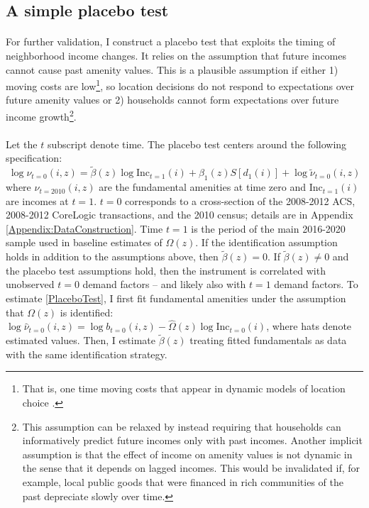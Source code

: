 \documentclass[12pt]{article}
\begin{document}
\subsection{A simple placebo test} 
\paragraph*{}
For further validation, I construct a placebo test that exploits the timing of neighborhood income changes. It relies on the assumption that future incomes cannot cause past amenity values. This is a plausible assumption if either 1) moving costs are low\footnote{That is, one time moving costs that appear in dynamic models of location choice \citep{CaliendoDvorkinParro, BMMT}.}, so location decisions do not respond to expectations over future amenity values or 2) households cannot form expectations over future income growth\footnote{This assumption can be relaxed by instead requiring that households can informatively predict future incomes only with past incomes. Another implicit assumption is that the effect of income on amenity values is not dynamic in the sense that it depends on lagged incomes. This would be invalidated if, for example, local public goods that were financed in rich communities of the past depreciate slowly over time.}. 
\paragraph*{}
Let the $t$ subscript denote time. The placebo test centers around the following specification:
\begin{equation}\label{PlaceboTest}
 	\log \nu_{t = 0}(i, z) =  \tilde{\beta}(z)\log\text{Inc}_{t = 1}(i) + \beta_{1}(z)S[d_{1}(i)] + \log \tilde{\nu}_{t = 0}(i, z)
\end{equation}
where $\nu_{t = 2010}(i, z)$ are the fundamental amenities at time zero and $\text{Inc}_{t = 1}(i)$ are incomes at $t = 1$. $t = 0$ corresponds to a cross-section of the 2008-2012 ACS, 2008-2012 CoreLogic transactions, and the 2010 census; details are in Appendix \ref{Appendix:DataConstruction}. Time $t = 1$ is the period of the main 2016-2020 sample used in baseline estimates of $\Omega(z)$. If the identification assumption holds in addition to the assumptions above, then  $\tilde{\beta}(z) = 0$. If $\tilde{\beta}(z) \neq 0$ and the placebo test assumptions hold, then the instrument is correlated with unobserved $t = 0$ demand factors -- and likely also with $t=1$ demand factors.   To estimate \eqref{PlaceboTest}, I first fit fundamental amenities under the assumption that $\Omega(z)$ is identified: $\log \hat{\nu}_{t = 0}(i, z) = \log b_{t = 0}(i, z) - \hat{\Omega}(z)\log \text{Inc}_{t = 0}(i)$, where hats denote estimated values. Then, I estimate $\tilde{\beta}(z)$ treating fitted fundamentals as data with the same identification strategy. 
\end{document}
